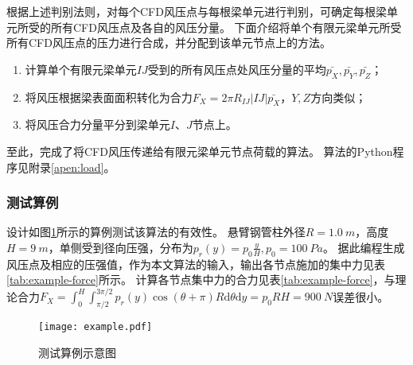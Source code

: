 根据上述判别法则，对每个CFD风压点与每根梁单元进行判别，可确定每根梁单元所受的所有CFD风压点及各自的风压分量。
下面介绍将单个有限元梁单元所受所有CFD风压点的压力进行合成，并分配到该单元节点上的方法。
\begin{enumerate}
	\item 计算单个有限元梁单元$IJ$受到的所有风压点处风压分量的平均$\bar{p_X},\bar{p_Y},\bar{p_Z}$；
	\item 将风压根据梁表面面积转化为合力$F_X=2\pi R_{IJ} |IJ| \bar{p_X}$，$Y,Z$方向类似；
	\item 将风压合力分量平分到梁单元$I$、$J$节点上。
\end{enumerate}
至此，完成了将CFD风压传递给有限元梁单元节点荷载的算法。
算法的Python程序见附录\ref{apen:load}。

\subsubsection{测试算例}
设计如图\ref{fig:example}所示的算例测试该算法的有效性。
悬臂钢管柱外径$R=\SI{1.0}{m}$，高度$H=\SI{9}{m}$，单侧受到径向压强，分布为$p_r(y)=p_0\frac{y}{H},p_0=\SI{100}{Pa}$。
据此编程生成风压点及相应的压强值，作为本文算法的输入，输出各节点施加的集中力见表\ref{tab:example-force}所示。
计算各节点集中力的合力见表\ref{tab:example-force}，与理论合力$F_X = \int_{0}^{H}\int_{\pi/2}^{3\pi/2}p_r(y)\cos(\theta+\pi)R \mathrm{d} \theta \mathrm{d} y = p_0 RH=\SI{900}{N}$误差很小。

\begin{figure}[!htbp]
	\centering
	\texttt{[image: example.pdf]}
	\caption{测试算例示意图}
	\label{fig:example}
\end{figure}

